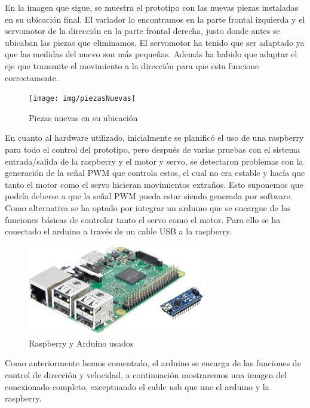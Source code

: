 \documentclass{pclass}
\begin{document}
\begin{itemize}
En la imagen que sigue, se muestra el prototipo con las nuevas piezas instaladas en su ubicación final. El variador lo encontramos en la parte frontal izquierda y el servomotor de la dirección en la parte frontal derecha, justo donde antes se ubicaban las piezas que eliminamos. El servomotor ha tenido que ser adaptado ya que las medidas del nuevo son más pequeñas. Además ha habido que adaptar el eje que transmite el movimiento a la dirección para que esta funcione correctamente.

\begin{figure}[H]
	\centering
	\texttt{[image: img/piezasNuevas]}
	\caption{Piezas nuevas en su ubicación}
	\label{fig:PiezasNuevas}
\end{figure}

En cuanto al hardware utilizado, inicialmente se planificó el uso de una raspberry para todo el control del prototipo, pero después de varias pruebas con el sistema entrada/salida de la raspberry y el motor y servo, se detectaron problemas con la generación de la señal PWM que controla estos, el cual no era estable y hacía que tanto el motor como el servo hicieran movimientos extraños. Esto suponemos que podría deberse a que la señal PWM pueda estar siendo generada por software. Como alternativa se ha optado por integrar un arduino que se encargue de las funciones básicas de controlar tanto el servo como el motor. Para ello se ha conectado el arduino a través de un cable USB a la raspberry.

\begin{figure}[H]
	\centering
	\includegraphics[width=0.7\textwidth]{img/raspArd}
	\caption{Raspberry y Arduino usados}
	\label{fig:RaspArd}
\end{figure}

Como anteriormente hemos comentado, el arduino se encarga de las funciones de control de dirección y velocidad, a continuación mostraremos una imagen del conexionado completo, exceptuando el cable usb que une el arduino y la raspberry.


\end{itemize}
\end{document}
